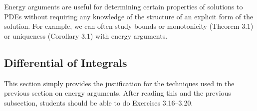 \documentclass{amsart}
\theoremstyle{plain}
\theoremstyle{definition}
\theoremstyle{remark}
\theoremstyle{definition}
\numberwithin{equation}{section}
\numberwithin{equation}{section}
\begin{document}
Energy arguments are useful for determining certain properties of solutions to PDEs without requiring any knowledge of the structure of an explicit form of the solution.
For example, we can often study bounds or monotonicity (Theorem 3.1) or uniqueness (Corollary 3.1) with energy arguments.

\subsection{Differential of Integrals}

This section simply provides the justification for the techniques used in the previous section on energy arguments.
After reading this and the previous subsection, students should be able to do Exercises 3.16--3.20. 
\end{document}
